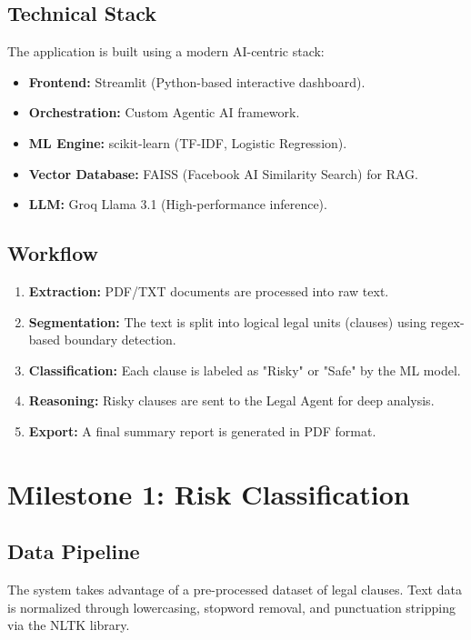 \documentclass[12pt, a4paper]{report}
\begin{document}
\section{Technical Stack}
The application is built using a modern AI-centric stack:
\begin{itemize}
    \item \textbf{Frontend:} Streamlit (Python-based interactive dashboard).
    \item \textbf{Orchestration:} Custom Agentic AI framework.
    \item \textbf{ML Engine:} scikit-learn (TF-IDF, Logistic Regression).
    \item \textbf{Vector Database:} FAISS (Facebook AI Similarity Search) for RAG.
    \item \textbf{LLM:} Groq Llama 3.1 (High-performance inference).
\end{itemize}

\section{Workflow}
\begin{enumerate}
    \item \textbf{Extraction:} PDF/TXT documents are processed into raw text.
    \item \textbf{Segmentation:} The text is split into logical legal units (clauses) using regex-based boundary detection.
    \item \textbf{Classification:} Each clause is labeled as "Risky" or "Safe" by the ML model.
    \item \textbf{Reasoning:} Risky clauses are sent to the Legal Agent for deep analysis.
    \item \textbf{Export:} A final summary report is generated in PDF format.
\end{enumerate}

\chapter{Milestone 1: Risk Classification}
\section{Data Pipeline}
The system takes advantage of a pre-processed dataset of legal clauses. Text data is normalized through lowercasing, stopword removal, and punctuation stripping via the NLTK library.
\end{document}
